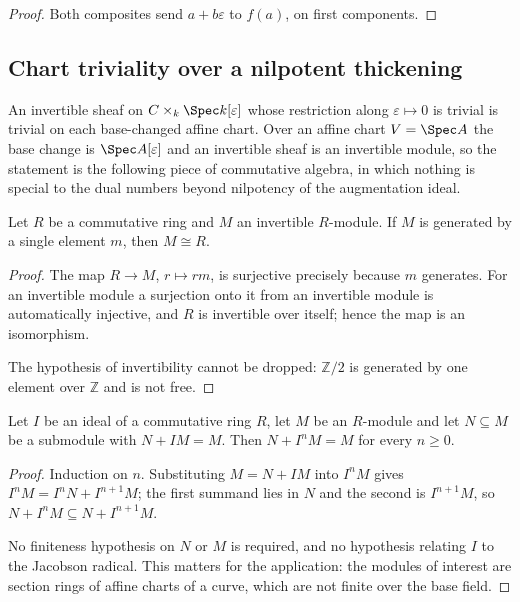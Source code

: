 \begin{proof}\leanok
  Both composites send \(a + b\varepsilon\) to \(f(a)\), on first
  components.
\end{proof}

\subsection{Chart triviality over a nilpotent thickening}

An invertible sheaf on \(C \times_k \Spec k[\varepsilon]\) whose restriction
along \(\varepsilon \mapsto 0\) is trivial is trivial on each base-changed
affine chart. Over an affine chart \(V = \Spec A\) the base change is
\(\Spec A[\varepsilon]\) and an invertible sheaf is an invertible module, so
the statement is the following piece of commutative algebra, in which nothing
is special to the dual numbers beyond nilpotency of the augmentation ideal.

\begin{lemma}\leanok
  \label{lem:invertible_cyclic_free}
  Let \(R\) be a commutative ring and \(M\) an invertible \(R\)-module. If
  \(M\) is generated by a single element \(m\), then \(M \cong R\).
\end{lemma}

\begin{proof}\leanok
  The map \(R \to M\), \(r \mapsto rm\), is surjective precisely because \(m\)
  generates. For an invertible module a surjection onto it from an invertible
  module is automatically injective, and \(R\) is invertible over itself;
  hence the map is an isomorphism.

  The hypothesis of invertibility cannot be dropped: \(\mathbb{Z}/2\) is
  generated by one element over \(\mathbb{Z}\) and is not free.
\end{proof}

\begin{lemma}\leanok
  \label{lem:nilpotent_nakayama}
  Let \(I\) be an ideal of a commutative ring \(R\), let \(M\) be an
  \(R\)-module and let \(N \subseteq M\) be a submodule with
  \(N + IM = M\). Then \(N + I^{n}M = M\) for every \(n \ge 0\).
\end{lemma}

\begin{proof}\leanok
  Induction on \(n\). Substituting \(M = N + IM\) into \(I^{n}M\) gives
  \(I^{n}M = I^{n}N + I^{n+1}M\); the first summand lies in \(N\) and the
  second is \(I^{n+1}M\), so \(N + I^{n}M \subseteq N + I^{n+1}M\).

  No finiteness hypothesis on \(N\) or \(M\) is required, and no hypothesis
  relating \(I\) to the Jacobson radical. This matters for the application:
  the modules of interest are section rings of affine charts of a curve, which
  are not finite over the base field.
\end{proof}

